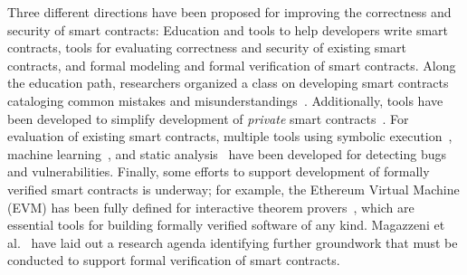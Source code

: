 Three different directions have been proposed for improving the correctness and security of smart contracts:  Education and tools to help developers write smart contracts, tools for evaluating correctness and security of existing smart contracts, and formal modeling and formal verification of smart contracts. Along the education path, researchers organized a class on developing smart contracts cataloging common mistakes and misunderstandings~\cite{FC:DAKMS16}. Additionally, tools have been developed to simplify development of \emph{private} smart contracts~\cite{SP:KMSWP16}. For evaluation of existing smart contracts, multiple tools using symbolic execution~\cite{CCS:LCOSH16}, machine learning~\cite{arxiv:Huang18}, and static analysis~\cite{CCS:BDFGGK+16,NDSS:KGDS18} have been developed for detecting bugs and vulnerabilities. Finally, some efforts to support development of formally verified smart contracts is underway; for example, the Ethereum Virtual Machine (EVM) has been fully defined for interactive theorem provers~\cite{Hirai17}, which are essential tools for building formally verified software of any kind. Magazzeni et al.~\cite{Magazzeni17} have laid out a research agenda identifying further groundwork that must be conducted to support formal verification of smart contracts.



